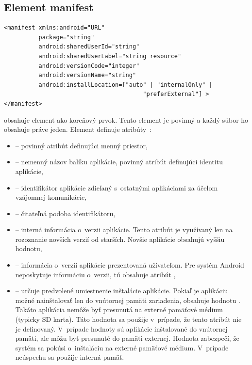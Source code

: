 \subsection{Element manifest}
\label{el_manifest}
\lstset{language=XML}
\begin{lstlisting}
<manifest xmlns:android="URL"
          package="string"
          android:sharedUserId="string"
          android:sharedUserLabel="string resource"
          android:versionCode="integer"
          android:versionName="string"
          android:installLocation=["auto" | "internalOnly" |
                                        "preferExternal"] >
</manifest>
\end{lstlisting}
 obsahuje element  ako koreňový prvok. Tento element je povinný a každý súbor  ho obsahuje práve jeden. \newline\newline
\noindent Element  definuje atribúty~\cite{elManifest}:\\
\begin{itemize}
\item {} -- povinný atribút definujúci menný priestor,
\item {} -- nemenný názov balíku aplikácie, povinný atribút definujúci identitu aplikácie,
\item {} -- identifikátor aplikácie zdieľaný s~ostatnými aplikáciami za účelom vzájomnej komunikácie,
\item {} -- čitateľná podoba  identifikátoru,
\item {} -- interná informácia o~verzii aplikácie. Tento atribút je využívaný len na rozoznanie novších verzií od starších. Novšie aplikácie obsahujú vyššiu hodnotu,
\item {} -- informácia o~verzii aplikácie prezentovaná užívateľom. Pre systém Android neposkytuje informáciu o~verzii, tú obsahuje atribút ,
\item {} -- určuje predvolené umiestnenie inštalácie aplikácie. Pokiaľ je aplikáciu možné nainštalovať len do vnútornej pamäti zariadenia, obsahuje hodnotu . Takáto aplikácia nemôže byť presunutá na externé pamäťové médium (typicky SD karta). Táto hodnota sa použije v~prípade, že tento atribút nie je definovaný. V~prípade hodnoty  sú aplikácie inštalované do vnútornej pamäti, ale môžu byť presunuté do pamäti externej. Hodnota  zabezpečí, že systém sa pokúsi o~inštaláciu na externé pamäťové médium. V~prípade neúspechu sa použije interná pamäť.
\end{itemize}

